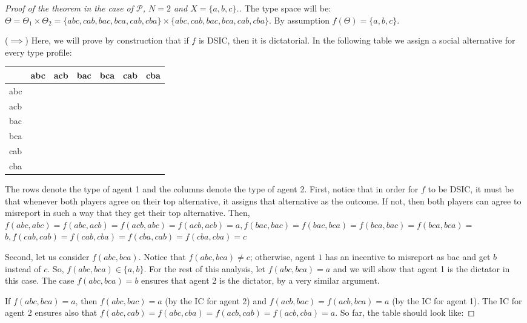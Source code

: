 \documentclass[11pt,leqno]{article}
\begin{document}
	\begin{proof}[Proof of the theorem in the case of $\mathcal{P}$, $N=2$ and $X=\{a,b,c\}$.]
		The type space will be: $\Theta=\Theta_1 \times \Theta_2=\{a b c, c a b, b a c, b c a, c a b, c b a\} \times\{a b c, c a b, b a c, b c a, c a b, c b a\}$. By assumption $f(\Theta)=\{a, b, c\}$. 
		
		($\implies$) Here, we will prove by construction that if $f$ is DSIC, then it is dictatorial. In the following table we assign a social alternative for every type profile:
		\begin{table}[http]
			\centering
			\begin{tabular}{l|l|l|l|l|l|l}
				\hline & abc & acb & bac & bca & cab & cba \\
				\hline abc & & & & & & \\
				\hline acb & & & & & & \\
				\hline bac & & & & & & \\
				\hline bca & & & & & & \\
				\hline cab & & & & & & \\
				\hline cba & & & & & & \\
				\hline
			\end{tabular}
		\end{table}
		
		The rows denote the type of agent 1 and the columns denote the type of agent 2. First, notice that in order for $f$ to be DSIC, it must be that whenever both players agree on their top alternative, it assigns that alternative as the outcome. If not, then both players can agree to misreport in such a way that they get their top alternative. Then, $f(a b c, a b c)=f(a b c, a c b)=f(a c b, a b c)=f(a c b, a c b)=a, f(b a c, b a c)=f(b a c, b c a)=f(b c a, b a c)=f(b c a, b c a)=$ $b, f(c a b, c a b)=f(c a b, c b a)=f(c b a, c a b)=f(c b a, c b a)=c$
		
		Second, let us consider $f(a b c, b c a)$. Notice that $f(a b c, b c a) \neq c$; otherwise, agent $1$ has an incentive to misreport as bac and get $b$ instead of $c$. So, $f(a b c, b c a) \in\{a, b\}$. For the rest of this analysis, let $f(a b c, b c a)=a$ and we will show that agent 1 is the dictator in this case. The case $f(a b c, b c a)=b$ ensures that agent 2 is the dictator, by a very similar argument.
		
		If $f(a b c, b c a)=a$, then $f(a b c, b a c)=a$ (by the IC for agent 2) and $f(a c b, b a c)=f(a c b, b c a)=a$ (by the IC for agent 1). The IC for agent 2 ensures also that $f(a b c, c a b)=f(a b c, c b a)=f(a c b, c a b)=f(a c b, c b a)=a$. So far, the table should look like:
		

\end{proof}
\end{document}
